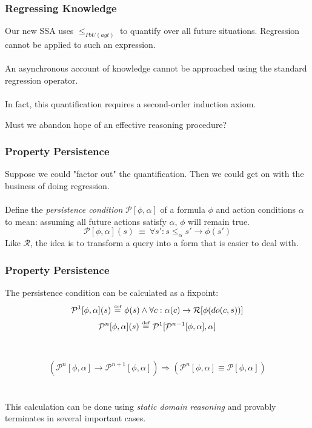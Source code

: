 \documentclass{beamer}
\newcommand{\isdef}{\hbox{$\stackrel{\mbox{\tiny def}}{=}$}}
\newcommand{\Reg}{\mathcal{R}}
\newcommand{\Pst}{\mathcal{P}}
\begin{document}
\begin{frame}
\frametitle{Regressing Knowledge}
Our new SSA uses $\leq_{PbU(agt)}$  to quantify over all future situations.  Regression cannot be applied to such an expression.
\ \\
\ \\
An asynchronous account of knowledge \alert{cannot} be approached using
the standard regression operator.
\ \\
\ \\
\pause
In fact, this quantification requires a second-order induction axiom.

Must we abandon hope of an effective reasoning procedure?
\end{frame}

\begin{frame}
\frametitle{Property Persistence}
Suppose we could "factor out" the quantification. Then we could get
on with the business of doing regression.
\ \\
\ \\
Define the \emph{persistence condition} $\mathcal{P}[\phi,\alpha]$ of a formula
 $\phi$ and action conditions $\alpha$ to mean: assuming all future actions
satisfy $\alpha$, $\phi$ will remain true.
\begin{equation*}
  \mathcal{P}[\phi,\alpha](s)\ \equiv\ \forall s': s \leq_{\alpha} s' \rightarrow \phi(s')
\end{equation*}
Like $\mathcal{R}$, the idea is to transform a query into a form that is easier
to deal with.
\end{frame}

\begin{frame}
\frametitle{Property Persistence}
The persistence condition can be calculated as a fixpoint:
\begin{equation*}
  \Pst^{1}[\phi,\alpha](s)\ \isdef\ \phi(s) \wedge \forall c: \alpha(c) \rightarrow \Reg[\phi(do(c,s))]
\end{equation*}
\begin{equation*}
  \Pst^{n}[\phi,\alpha](s)\ \isdef\ \Pst^{1}[\Pst^{n-1}[\phi,\alpha],\alpha]
\end{equation*}
\ \\
\ \\
\pause
\begin{equation*}
  \left(\Pst^{n}[\phi,\alpha] \rightarrow \Pst^{n+1}[\phi,\alpha]\right) \Rightarrow \left(\Pst^{n}[\phi,\alpha] \equiv \Pst[\phi,\alpha]\right)
\end{equation*}
\ \\
\ \\
This calculation can be done using \emph{static domain reasoning} and provably terminates in several important cases.
\end{frame}
\end{document}
